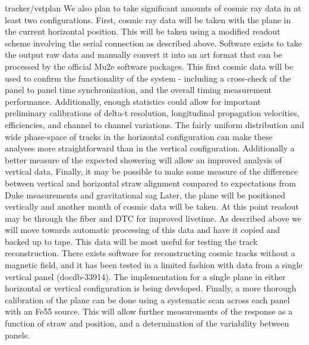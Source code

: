 tracker/vstplan
We also plan to take significant amounts of cosmic ray data in at least two configurations. First, cosmic ray data will be taken with the plane in the current horizontal
position. This will be taken using a modified readout scheme involving the serial
connection as described above. Software exists to take the output raw data and manually convert it into an art format that can be processed by the official Mu2e software
packages. This first cosmic data will be used to confirm the functionality of the system - including a cross-check of the panel to panel time synchronization, and the
overall timing measurement performance. 
Additionally, enough statistics could allow
for important preliminary calibrations of delta-t resolution, longitudinal propagation
velocities, efficiencies, and channel to channel variations. The fairly uniform distribution and wide phase-space of tracks in the horizontal configuration can make these
analyses more straightforward than in the vertical configuration. Additionally a better measure of the expected showering will allow an improved analysis of vertical data.
Finally, it may be possible to make some measure of the difference between vertical
and horizontal straw alignment compared to expectations from Duke measurements
and gravitational sag
Later, the plane will be positioned vertically and another month of cosmic data
will be taken. At this point readout may be through the fiber and DTC for improved
livetime. As described above we will move towards automatic processing of this
data and have it copied and backed up to tape. This data will be most useful for
testing the track reconstruction. There exists software for reconstructing cosmic
tracks without a magnetic field, and it has been tested in a limited fashion with
data from a single vertical panel (docdb-33914). The implementation for a single
plane in either horizontal or vertical configuration is being developed.
Finally, a more thorough calibration of the plane can be done using a systematic
scan across each panel with an Fe55 source. This will allow further measurements of
the response as a function of straw and position, and a determination of the variability
between panels.